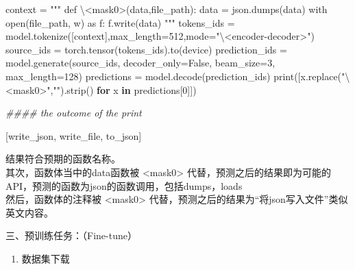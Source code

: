 \documentclass[
]{article}
\newenvironment{Shaded}{}{}
\newcommand{\BuiltInTok}[1]{\textcolor[rgb]{0.00,0.50,0.00}{#1}}
\newcommand{\CommentTok}[1]{\textcolor[rgb]{0.38,0.63,0.69}{\textit{#1}}}
\newcommand{\ControlFlowTok}[1]{\textcolor[rgb]{0.00,0.44,0.13}{\textbf{#1}}}
\newcommand{\DecValTok}[1]{\textcolor[rgb]{0.25,0.63,0.44}{#1}}
\newcommand{\KeywordTok}[1]{\textcolor[rgb]{0.00,0.44,0.13}{\textbf{#1}}}
\newcommand{\NormalTok}[1]{#1}
\newcommand{\OperatorTok}[1]{\textcolor[rgb]{0.40,0.40,0.40}{#1}}
\newcommand{\StringTok}[1]{\textcolor[rgb]{0.25,0.44,0.63}{#1}}
\newcommand{\VariableTok}[1]{\textcolor[rgb]{0.10,0.09,0.49}{#1}}
\begin{document}
\begin{Shaded}
  \begin{Highlighting}[]
    \NormalTok{context }\OperatorTok{=} \StringTok{"""}
    \StringTok{def \textbackslash{}\textless{}mask0\textgreater{}(data,file\_path):}
    \StringTok{    data = json.dumps(data)}
    \StringTok{    with open(file\_path, \textquotesingle{}w\textquotesingle{}) as f:}
    \StringTok{        f.write(data)}
    \StringTok{"""}
    \NormalTok{tokens\_ids }\OperatorTok{=}\NormalTok{ model.tokenize([context],max\_length}\OperatorTok{=}\DecValTok{512}\NormalTok{,mode}\OperatorTok{=}\StringTok{"\textbackslash{}\textless{}encoder{-}decoder\textgreater{}"}\NormalTok{)}
    \NormalTok{source\_ids }\OperatorTok{=}\NormalTok{ torch.tensor(tokens\_ids).to(device)}
    \NormalTok{prediction\_ids }\OperatorTok{=}\NormalTok{ model.generate(source\_ids, decoder\_only}\OperatorTok{=}\VariableTok{False}\NormalTok{, beam\_size}\OperatorTok{=}\DecValTok{3}\NormalTok{, max\_length}\OperatorTok{=}\DecValTok{128}\NormalTok{)}
    \NormalTok{predictions }\OperatorTok{=}\NormalTok{ model.decode(prediction\_ids)}
    \BuiltInTok{print}\NormalTok{([x.replace(}\StringTok{"\textbackslash{}\textless{}mask0\textgreater{}"}\NormalTok{,}\StringTok{""}\NormalTok{).strip() }\ControlFlowTok{for}\NormalTok{ x }\KeywordTok{in}\NormalTok{ predictions[}\DecValTok{0}\NormalTok{]])}

    \CommentTok{\#\#\#\# the outcome of the print}

    \NormalTok{[}\StringTok{\textquotesingle{}write\_json\textquotesingle{}}\NormalTok{, }\StringTok{\textquotesingle{}write\_file\textquotesingle{}}\NormalTok{, }\StringTok{\textquotesingle{}to\_json\textquotesingle{}}\NormalTok{]}
  \end{Highlighting}
\end{Shaded}

结果符合预期的函数名称。\\
其次，函数体当中的data函数被 \textless{}mask0\textgreater{}
代替，预测之后的结果即为可能的API，预测的函数为json的函数调用，包括dumps，loads\\
然后，函数体的注释被 \textless{}mask0\textgreater{}
代替，预测之后的结果为``将json写入文件''类似英文内容。

三、预训练任务：（Fine-tune）

\begin{enumerate}
  \def\labelenumi{\arabic{enumi}.}
  \item
        数据集下载
\end{enumerate}
\end{document}
